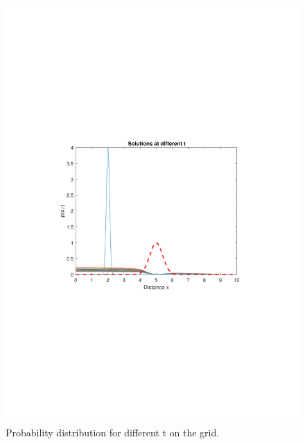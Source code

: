 \documentclass[11pt,letterpaper]{article}
\begin{document}
\begin{figure}
\centering
\includegraphics[width=1\linewidth]{./different_times}
\caption{Probability distribution for different t on the grid.}
\label{fig:different_times}
\end{figure}
\end{document}
